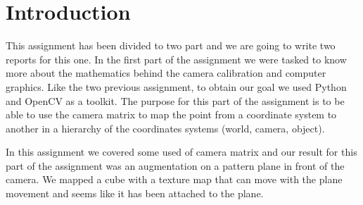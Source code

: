 \pagebreak{}
\section{Introduction}

This assignment has been divided to two part and we are going to write two reports for this one. In the first part of the assignment we were tasked to know more about the mathematics behind the camera calibration and computer graphics. Like the two previous assignment, to obtain our goal we used Python and OpenCV as a toolkit. The purpose for this part of the assignment is to be able to use the camera matrix to map the point from a coordinate system to another in a hierarchy of the coordinates systems (world, camera, object).

In this assignment we covered some used of camera matrix and our result for this part of the assignment was an augmentation on a pattern plane in front of the camera. We mapped a cube with a texture map that can move with the plane movement and seems like it has been attached to the plane.
